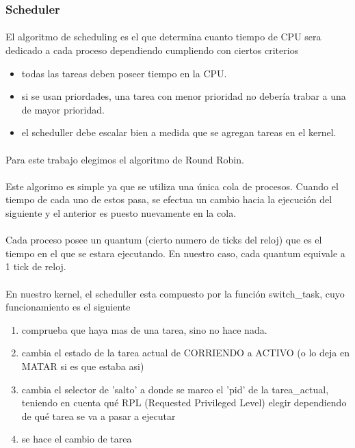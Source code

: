 \documentclass[11pt, a4paper]{article}
\begin{document}
\subsubsection{Scheduler}
\paragraph{}
El algoritmo de scheduling es el que determina cuanto tiempo de CPU sera dedicado a cada proceso dependiendo cumpliendo con ciertos criterios
\begin{itemize}
\item todas las tareas deben poseer tiempo en la CPU.
\item si se usan priordades, una tarea con menor prioridad no debería trabar a una de mayor prioridad.
\item el scheduller debe escalar bien a medida que se agregan tareas en el kernel.
\end{itemize}


\paragraph{}
Para este trabajo elegimos el algoritmo de Round Robin.

\paragraph{}

Este algorimo es simple ya que se utiliza una única cola de procesos. Cuando el tiempo de cada uno de estos pasa, se efectua un cambio hacia la ejecución del siguiente y el anterior es puesto nuevamente en la cola. 
\paragraph{}
Cada proceso posee un quantum (cierto numero de ticks del reloj) que es el tiempo en el que se estara ejecutando. En nuestro caso, cada quantum equivale a 1 tick de reloj.


\paragraph{}
En nuestro kernel, el scheduller esta compuesto por la funci\'on switch\_task, cuyo funcionamiento es el siguiente

\begin{enumerate}
\item comprueba que haya mas de una tarea, sino no hace nada.
\item cambia el estado de la tarea actual de CORRIENDO a ACTIVO (o lo deja en MATAR si es que estaba asi)
\item cambia el selector de 'salto' a donde se marco el 'pid' de la tarea\_actual, teniendo en cuenta qué RPL (Requested Privileged Level) elegir dependiendo de qué tarea se va a pasar a ejecutar
\item se hace el cambio de tarea
\end{enumerate}
\end{document}
